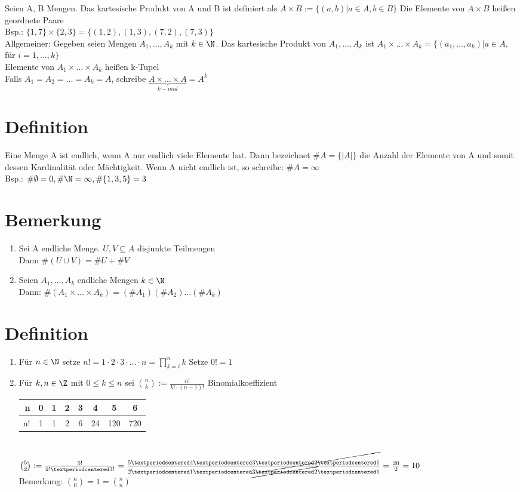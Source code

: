 Seien A, B Mengen. Das kartesische Produkt von A und B ist definiert als $A × B := \{(a,b)|a\in A, b \in B\}$ Die Elemente von $A × B$ heißen geordnete Paare\\
Bsp.: $\{1,7\}\times \{2,3\}=\{(1,2),(1,3),(7,2),(7,3)\}$\\
Allgemeiner: Gegeben seien Mengen
$A_1,…,A_k$ mit $k \in \N$. Das kartesische Produkt von $A_1,…,A_k$ ist $A_1\times …\times A_k = \{(a_1,…,a_k)|a\in A, $für $i=1,…,k\}$\\
Elemente von $A_1 × … × A_k$ heißen k-Tupel\\
Falls $A_1=A_2=…=A_k=A$, schreibe $\underbrace{A\times…\times A}_{k-mal}=A^k$

\section{Definition}
Eine Menge A ist endlich, wenn A nur endlich viele Elemente hat. Dann bezeichnet
$\#A = \{|A|\}$ die Anzahl der Elemente von A und somit dessen Kardinalit\"at
oder M\"achtigkeit. Wenn A nicht endlich ist, so schreibe: $\# A= \infty$\\
Bsp.: $\#\emptyset = 0, \#\N=\infty, \# \{1,3,5\} = 3$

\section{Bemerkung}
\begin{enumerate}
\item Sei A endliche Menge. $U,V\subseteq A$ disjunkte Teilmengen\\
Dann $\#(U\cup V)=\# U + \# V$ 
\item Seien $A_1,…,A_k$ endliche Mengen $k \in \N$\\
Dann: $\#(A_1 \times … \times A_k)=(\#A_1)(\#A_2)…(\#A_k)$
\end{enumerate}

\section{Definition}
\begin{enumerate}
\item Für $n\in \N$ setze $n!=1· 2· 3· … · n=\prod_{k=i}^n k$
Setze $0!=1$
\item Für $k,n\in \Z$ mit $0\le k \le n$ sei $\binom{n}{k}:= \frac{n!}{k!·(n-1)!}$ \Rarr{} Binomialkoeffizient\\
\begin{tabular}{r|c|c|c|c|c|c|c}
n & 0 & 1 & 2 & 3 & 4 & 5 & 6\\ \hline
n! & 1 & 1 & 2 & 6 & 24 & 120 & 720
\end{tabular}\\
\bsp
$\binom{5}{2} := \frac{5!}{2!· 3!} = \frac{5· 4 ·\cancel{3 · 2 · 1}}{2· 1· \cancel{3· 2}· 1 } = \frac{20}{2}=10$\\
Bemerkung: $\binom{n}{0}= 1 = \binom{n}{n}$
\end{enumerate}